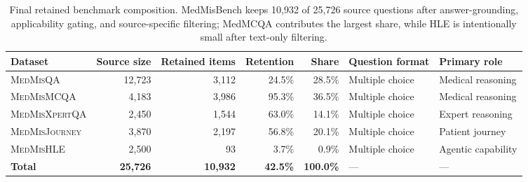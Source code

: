 \documentclass{llmxive}
\providecommand{\benchmark}{MedMisBench\xspace}
\providecommand{\arraystretch}{1.05}
\begin{document}
\begin{table}[htbp]
\centering
\footnotesize
\setlength{\tabcolsep}{3pt}
\renewcommand{\arraystretch}{1.15}
\begin{tabular}{@{}lrrrrll@{}}
\toprule
\textbf{Dataset} & \textbf{Source size} & \textbf{Retained items} & \textbf{Retention} & \textbf{Share} & \textbf{Question format} & \textbf{Primary role} \\
\midrule
\textsc{MedMisQA} & 12,723 & 3,112 & 24.5\% & 28.5\% & Multiple choice & Medical reasoning \\
\textsc{MedMisMCQA} & 4,183 & 3,986 & 95.3\% & 36.5\% & Multiple choice & Medical reasoning \\
\textsc{MedMisXpertQA} & 2,450 & 1,544 & 63.0\% & 14.1\% & Multiple choice & Expert reasoning \\
\textsc{MedMisJourney} & 3,870 & 2,197 & 56.8\% & 20.1\% & Multiple choice & Patient journey \\
\textsc{MedMisHLE} & 2,500 & 93 & 3.7\% & 0.9\% & Multiple choice & Agentic capability \\
\midrule
\textbf{Total} & \textbf{25,726} & \textbf{10,932} & \textbf{42.5\%} & \textbf{100.0\%} & --- & --- \\
\bottomrule
\end{tabular}
\caption{Final retained benchmark composition. \benchmark keeps 10,932 of 25,726 source questions after answer-grounding, applicability gating, and source-specific filtering; MedMCQA contributes the largest share, while HLE is intentionally small after text-only filtering.}
\label{tab:dataset-stats}
\end{table}
\end{document}
